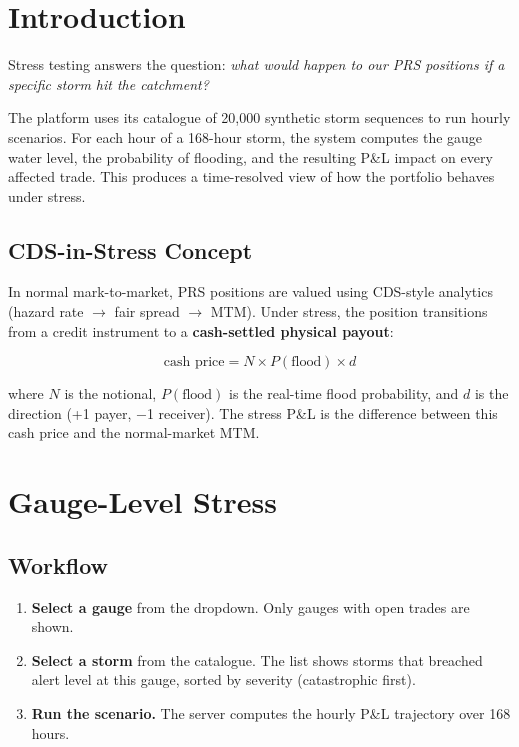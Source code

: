 \documentclass[11pt,a4paper]{article}
\begin{document}
\mkmtitlepage
\mkmlegalpage

\tableofcontents
\clearpage


\section{Introduction}

Stress testing answers the question: \emph{what would happen to our
PRS positions if a specific storm hit the catchment?}

The platform uses its catalogue of 20,000 synthetic storm sequences to
run hourly scenarios.  For each hour of a 168-hour storm, the system
computes the gauge water level, the probability of flooding, and the
resulting P\&L impact on every affected trade.  This produces a
time-resolved view of how the portfolio behaves under stress.

\subsection{CDS-in-Stress Concept}

In normal mark-to-market, PRS positions are valued using CDS-style
analytics (hazard rate $\to$ fair spread $\to$ MTM).  Under stress,
the position transitions from a credit instrument to a
\textbf{cash-settled physical payout}:

\[
  \text{cash price} = N \times P(\text{flood}) \times d
\]

\noindent where $N$ is the notional, $P(\text{flood})$ is the real-time
flood probability, and $d$ is the direction (+1 payer, $-$1 receiver).
The stress P\&L is the difference between this cash price and the
normal-market MTM.


\section{Gauge-Level Stress}

\subsection{Workflow}

\begin{enumerate}
  \item \textbf{Select a gauge} from the dropdown.  Only gauges with
        open trades are shown.
  \item \textbf{Select a storm} from the catalogue.  The list shows
        storms that breached alert level at this gauge, sorted by
        severity (catastrophic first).
  \item \textbf{Run the scenario.}  The server computes the hourly
        P\&L trajectory over 168 hours.
\end{enumerate}
\end{document}
